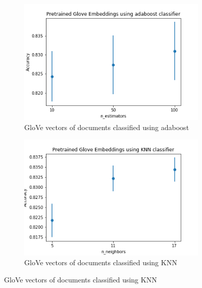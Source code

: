 \documentclass{article}
\begin{document}
    
    \begin{figure}
        \centering
     
        \begin{subfigure}[b]{0.5\textwidth}
            \includegraphics[width=\textwidth]{glove-ada.png}
            \caption{GloVe vectors of documents classified using adaboost}
            \label{fig:glove-ada}
        \end{subfigure}
        
        \begin{subfigure}[b]{0.5\textwidth}
            \includegraphics[width=\textwidth]{glove-knn.png}
            \caption{GloVe vectors of documents classified using KNN}
            \label{fig:glove-knn}
        \end{subfigure}
        

\end{figure}
\end{document}
